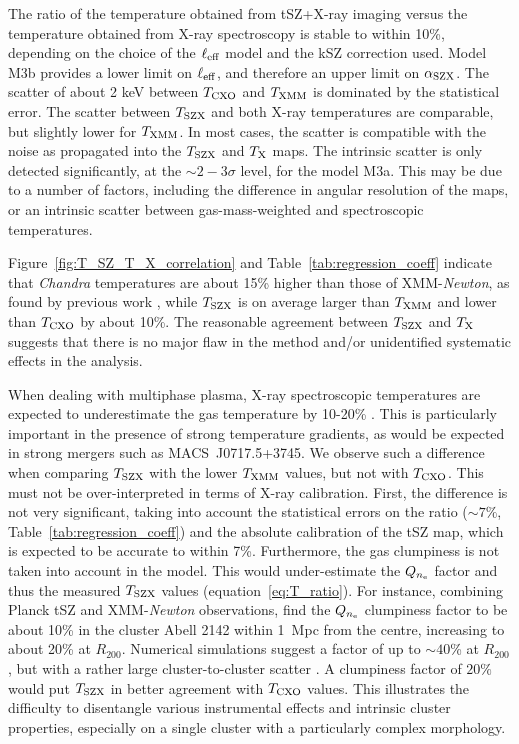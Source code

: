 \documentclass[twocolumn,traditabstract]{aa}
\newcommand{\ccor}[1]{\textcolor{Mypink}{#1}}
\def\TSZ {T_{\rm SZX}}
\def \TXC {T_{\rm CXO}}
\def \TXX {T_{\rm XMM}}
\def \TX {T_{\rm X}}
\begin{document}
The ratio of the temperature obtained from tSZ+X-ray imaging versus the temperature obtained from X-ray spectroscopy is stable to within 10\%, depending on the choice of the $\ell_{\rm eff}$ model and the kSZ correction used. Model M3b provides a lower limit on $\ell_{\rm eff}$, and therefore an upper limit on $\alpha_{\rm SZX}$. The scatter of about 2 keV between $\TXC$ and $\TXX$ is dominated by the statistical error. The scatter between $\TSZ$ and both X-ray temperatures are comparable, \ccor{but slightly lower for $\TXX$}. \ccor{In most cases, the scatter is compatible with the noise as propagated into the $\TSZ$ and $\TX$ maps. The intrinsic scatter is only detected significantly, at the $\sim 2-3\sigma$ level, for the model M3a. This may be due to a number of factors, including the difference in angular resolution of the maps, or an intrinsic scatter between gas-mass-weighted and spectroscopic temperatures.}

Figure~\ref{fig:T_SZ_T_X_correlation} and Table~\ref{tab:regression_coeff} indicate that \textit{Chandra} temperatures are about 15\% higher than those of XMM-\textit{Newton}, as found by previous work \citep{Mahdavi2013,sch15}, \ccor{while $\TSZ$ is on average larger than $\TXX$ and lower than $\TXC$ by about 10\%. The reasonable agreement between $\TSZ$ and $\TX$ suggests that there is no major flaw in the method and/or unidentified systematic effects in the analysis.}

\ccor{When dealing with multiphase plasma, X-ray spectroscopic temperatures are expected to underestimate the gas temperature by 10-20\% \citep{Mathiesen2001,maz04}. This is particularly important in the presence of strong temperature gradients, as would be expected in strong mergers such as \mbox{MACS~J0717.5+3745}. We observe such a difference when comparing $\TSZ$ with the lower $\TXX$ values, but not with $\TXC$. This must not be over-interpreted in terms of X-ray calibration. First, the difference is not very significant, taking into account the statistical errors on the ratio ($\sim 7\%$, Table~\ref{tab:regression_coeff}) and the absolute calibration of the tSZ map, which is expected to be accurate to within 7\%. Furthermore, the gas clumpiness is not taken into account in the model. This would under-estimate the $Q_{n_{\rm e}}$ factor and thus the measured $\TSZ$ values (equation~\ref{eq:T_ratio}). For instance, combining Planck tSZ \citep{Planck2015I} and XMM-\textit{Newton} observations, \citet{Tchernin2016} find the $Q_{n_{\rm e}}$ clumpiness factor to be about 10\% in the cluster Abell 2142 within 1~Mpc from the centre, increasing to about 20\% at $R_{200}$. Numerical simulations suggest a factor of up to $\sim 40$\% at $R_{200}$, but with a rather large cluster-to-cluster scatter \citep[e.g.,][]{Nagai2011,Zhuravleva2013,Vazza2013}. A clumpiness factor of $20\%$ would put $\TSZ$ in better agreement with $\TXC$ values. This illustrates the difficulty to disentangle various instrumental effects and intrinsic cluster properties, especially on a single cluster with a particularly complex morphology.} 
\end{document}
